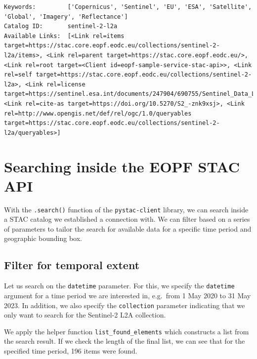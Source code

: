 \documentclass[
  letterpaper,
  DIV=11,
  numbers=noendperiod]{scrreprt}
\begin{document}
\begin{verbatim}
Keywords:         ['Copernicus', 'Sentinel', 'EU', 'ESA', 'Satellite', 'Global', 'Imagery', 'Reflectance']
Catalog ID:       sentinel-2-l2a
Available Links:  [<Link rel=items target=https://stac.core.eopf.eodc.eu/collections/sentinel-2-l2a/items>, <Link rel=parent target=https://stac.core.eopf.eodc.eu/>, <Link rel=root target=<Client id=eopf-sample-service-stac-api>>, <Link rel=self target=https://stac.core.eopf.eodc.eu/collections/sentinel-2-l2a>, <Link rel=license target=https://sentinel.esa.int/documents/247904/690755/Sentinel_Data_Legal_Notice>, <Link rel=cite-as target=https://doi.org/10.5270/S2_-znk9xsj>, <Link rel=http://www.opengis.net/def/rel/ogc/1.0/queryables target=https://stac.core.eopf.eodc.eu/collections/sentinel-2-l2a/queryables>]
\end{verbatim}

\section{Searching inside the EOPF STAC
API}\label{searching-inside-the-eopf-stac-api}

With the \texttt{.search()} function of the \texttt{pystac-client}
library, we can search inside a STAC catalog we established a connection
with. We can filter based on a series of parameters to tailor the search
for available data for a specific time period and geographic bounding
box.

\subsection{Filter for temporal
extent}\label{filter-for-temporal-extent}

Let us search on the \texttt{datetime} parameter. For this, we specify
the \texttt{datetime} argument for a time period we are interested in,
e.g.~from 1 May 2020 to 31 May 2023. In addition, we also specify the
\texttt{collection} parameter indicating that we only want to search for
the Sentinel-2 L2A collection.

We apply the helper function \texttt{list\_found\_elements} which
constructs a list from the search result. If we check the length of the
final list, we can see that for the specified time period, 196 items
were found.
\end{document}
